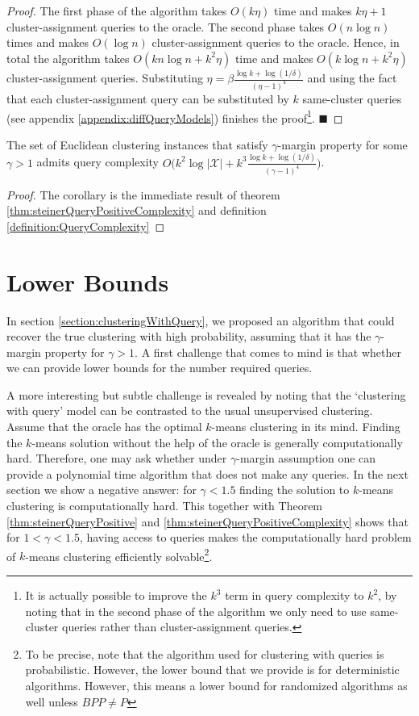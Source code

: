 \documentclass[orivec]{llncs}
\newcommand{\mc}{\mathcal}
\renewcommand{\qed}{\hfill\ensuremath{\blacksquare}}
\begin{document}
\begin{proof}
The first phase of the algorithm takes $O(k\eta)$ time and makes $k\eta+1$ cluster-assignment queries to the oracle. The second phase takes $O(n\log n)$ times and makes $O(\log n)$ cluster-assignment queries to the oracle. Hence, in total the algorithm takes $O(kn\log n + k^2\eta)$ time and makes $O(k\log n + k^2\eta)$ cluster-assignment queries. Substituting $\eta = \beta\frac{\log k + \log(1/\delta)}{(\eta-1)^4}$ and using the fact that each cluster-assignment query can be substituted by $k$ same-cluster queries (see appendix \ref{appendix:diffQueryModels}) finishes the proof\footnote{It is actually possible to improve the $k^3$ term in query complexity to $k^2$, by noting that in the second phase of the algorithm we only need to use same-cluster queries rather than cluster-assignment queries.}.
\qed
\end{proof}

\begin{corollary}
The set of Euclidean clustering instances that satisfy $\gamma$-margin property for some $\gamma > 1$ admits query complexity $O\big(k^2\log |\mc X| + k^3\frac{\log k + \log (1/\delta)}{(\gamma - 1)^4}\big)$. 
\begin{proof}
The corollary is the immediate result of theorem \ref{thm:steinerQueryPositiveComplexity} and definition \ref{definition:QueryComplexity}
\end{proof}

\end{corollary}

\section{Lower Bounds}
\label{section:lowerBounds}
In section \ref{section:clusteringWithQuery}, we proposed an algorithm that could recover the true clustering with high probability, assuming that it has the $\gamma$-margin property for $\gamma>1$. A first challenge that comes to mind is that whether we can provide lower bounds for the number required queries.

A more interesting but subtle challenge is revealed by noting that the `clustering with query' model can be contrasted to the usual unsupervised clustering. Assume that the oracle has the optimal $k$-means clustering in its mind. Finding the $k$-means solution without the help of the oracle is generally computationally hard. Therefore, one may ask whether under $\gamma$-margin assumption one can provide a polynomial time algorithm that does not make any queries. In the next section we show a negative answer: for $\gamma < 1.5$ finding the solution to $k$-means clustering is computationally hard. This together with Theorem \ref{thm:steinerQueryPositive} and \ref{thm:steinerQueryPositiveComplexity} shows that for $1<\gamma<1.5$, having access to queries makes the computationally hard problem of $k$-means clustering efficiently solvable\footnote{To be precise, note that the algorithm used for clustering with queries is probabilistic. However, the lower bound that we provide is for deterministic algorithms. However, this means a lower bound for randomized algorithms as well unless $BPP\neq P$}.
\end{document}
